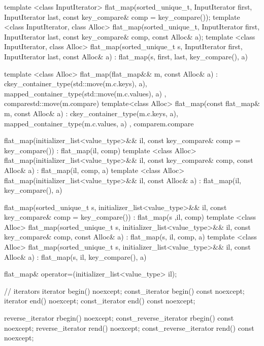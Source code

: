\begin{codeblock}
\begin{codeblock}
\begin{codeblock}
\begin{addedblock}
\begin{codeblock}
{{      template <class InputIterator>
        flat_map(sorted_unique_t, InputIterator first, InputIterator last,
                 const key_compare& comp = key_compare());
      template <class InputIterator, class Alloc>
        flat_map(sorted_unique_t, InputIterator first, InputIterator last,
                 const key_compare& comp, const Alloc& a);
      template <class InputIterator, class Alloc>
        flat_map(sorted_unique_t s, InputIterator first, InputIterator last,
                 const Alloc& a)
          : flat_map(s, first, last, key_compare(), a) { }

      template <class Alloc>
        flat_map(flat_map&& m, const Alloc& a)
          : c{key_container_type(std::move(m.c.keys), a),
              mapped_container_type(std::move(m.c.values), a)}
          , compare{std::move(m.compare)}
        { }
      template<class Alloc>
        flat_map(const flat_map& m, const Alloc& a)
          : c{key_container_type(m.c.keys, a),
              mapped_container_type(m.c.values, a)}
          , compare{m.compare}
        { }

      flat_map(initializer_list<value_type>&& il,
               const key_compare& comp = key_compare())
          : flat_map(il, comp) { }
      template <class Alloc>
        flat_map(initializer_list<value_type>&& il,
                 const key_compare& comp, const Alloc& a)
          : flat_map(il, comp, a) { }
      template <class Alloc>
        flat_map(initializer_list<value_type>&& il, const Alloc& a)
          : flat_map(il, key_compare(), a) { }

      flat_map(sorted_unique_t s, initializer_list<value_type>&& il,
               const key_compare& comp = key_compare())
          : flat_map(s ,il, comp) { }
      template <class Alloc>
        flat_map(sorted_unique_t s, initializer_list<value_type>&& il,
                 const key_compare& comp, const Alloc& a)
          : flat_map(s, il, comp, a) { }
      template <class Alloc>
        flat_map(sorted_unique_t s, initializer_list<value_type>&& il,
                 const Alloc& a)
          : flat_map(s, il, key_compare(), a) { }

      flat_map& operator=(initializer_list<value_type> il);

      // iterators
      iterator                begin() noexcept;
      const_iterator          begin() const noexcept;
      iterator                end() noexcept;
      const_iterator          end() const noexcept;

      reverse_iterator        rbegin() noexcept;
      const_reverse_iterator  rbegin() const noexcept;
      reverse_iterator        rend() noexcept;
      const_reverse_iterator  rend() const noexcept;

}}
\end{codeblock}
\end{addedblock}
\end{codeblock}
\end{codeblock}
\end{codeblock}
